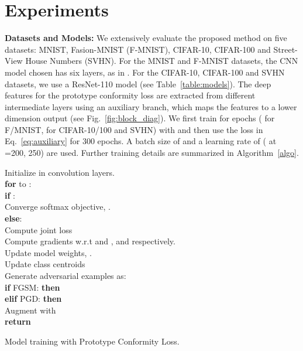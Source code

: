 \documentclass[10pt,twocolumn,letterpaper]{article}
\begin{document}
\section{Experiments}
\label{sec:experiments}
\vspace{-0.25em}
\noindent \textbf{Datasets and Models:} We extensively evaluate the proposed method on five datasets: MNIST, Fasion-MNIST (F-MNIST), CIFAR-10, CIFAR-100 and Street-View House Numbers (SVHN). For the MNIST and F-MNIST datasets, the CNN model chosen has six layers, as in \cite{wen2016discriminative}. For the CIFAR-10, CIFAR-100 and SVHN datasets, we use a ResNet-110 model \cite{he2016deep} (see Table~\ref{table:models}). The deep features for the prototype conformity loss are extracted from different intermediate layers using an auxiliary branch, which maps the features to a lower dimension output (see Fig.~\ref{fig:block_diag}). We first train for  epochs ( for F/MNIST,  for CIFAR-10/100 and SVHN) with  and then use the loss in Eq.~\ref{eq:auxiliary} for 300 epochs. A batch size of  and a learning rate of  ( at =200, 250) are used. Further training details are summarized in Algorithm~\ref{algo}.

\begin{algorithm}[h]
\footnotesize{}
\footnotesize{}
\vspace{2mm}
Initialize  in convolution layers.\\
\textbf{for}  to :\\
\qquad \textbf{if} :\\
\qquad\qquad  Converge softmax objective, .\\
\qquad \textbf{else}:\\
\qquad\qquad Compute joint loss \\
\qquad\qquad   Compute gradients w.r.t  and ,   and  respectively.\\
\qquad\qquad  Update model weights, . \\
\qquad\qquad Update class centroids  \\
\qquad\qquad  Generate adversarial examples as:\\
\qquad \qquad\qquad  \textbf{if} FGSM: \textbf{then}   \\
\qquad\qquad \qquad  \textbf{elif} PGD: \textbf{then} \\
\qquad\qquad  Augment  with \\  
\textbf{return} 

\caption{\footnotesize{ Model training with Prototype Conformity Loss.}}
\label{algo}
\end{algorithm}
\vspace{-1.0em}
\end{document}
